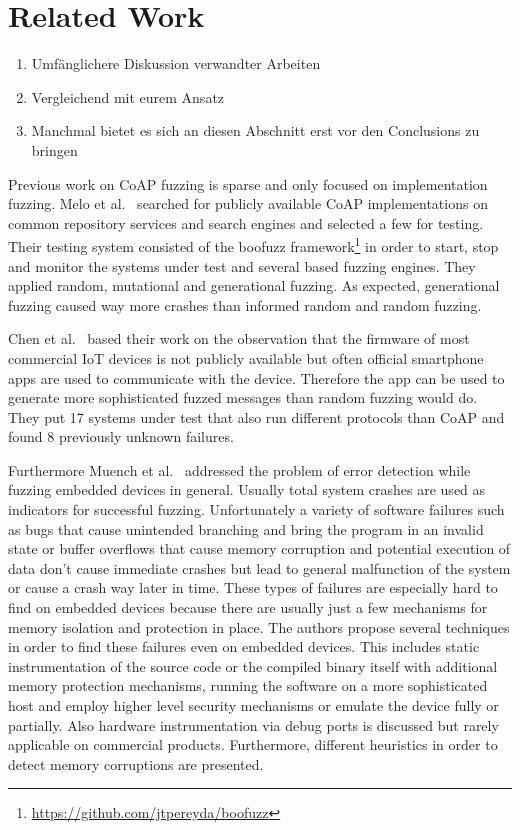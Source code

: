 \section{Related Work}
\label{section:related_work}

\begin{enumerate}
	\item Umfänglichere Diskussion verwandter Arbeiten
	\item Vergleichend mit eurem Ansatz
	\item Manchmal bietet es sich an diesen Abschnitt erst vor den Conclusions zu bringen
\end{enumerate}

Previous work on CoAP fuzzing is sparse and only focused on implementation fuzzing. Melo et al.~\cite{Melo2017RobustnessTO} searched for publicly available CoAP implementations on common repository services and search engines and selected a few for testing. Their testing system consisted of the boofuzz framework\footnote{\url{https://github.com/jtpereyda/boofuzz}} in order to start, stop and monitor the systems under test and several \scapy based fuzzing engines. They applied random, mutational and generational fuzzing. As expected, generational fuzzing caused way more crashes than informed random and random fuzzing.

Chen et al.~\cite{chen2018ndss} based their work on the observation that the firmware of most commercial IoT devices is not publicly available but often official smartphone apps are used to communicate with the device. Therefore the app can be used to generate more sophisticated fuzzed messages than random fuzzing would do. They put 17 systems under test that also run different protocols than CoAP and found 8 previously unknown failures.

Furthermore Muench et al.~\cite{EURECOM+5417} addressed the problem of error detection while fuzzing embedded devices in general. Usually total system crashes are used as indicators for successful fuzzing. Unfortunately a variety of software failures such as bugs that cause unintended branching and bring the program in an invalid state or buffer overflows that cause memory corruption and potential execution of data don't cause immediate crashes but lead to general malfunction of the system or cause a crash way later in time. These types of failures are especially hard to find on embedded devices because there are usually just a few mechanisms for memory isolation and protection in place. The authors propose several techniques in order to find these failures even on embedded devices. This includes static instrumentation of the source code or the compiled binary itself with additional memory protection mechanisms, running the software on a more sophisticated host and employ higher level security mechanisms or emulate the device fully or partially. Also hardware instrumentation via debug ports is discussed but rarely applicable on commercial products. Furthermore, different heuristics in order to detect memory corruptions are presented.

